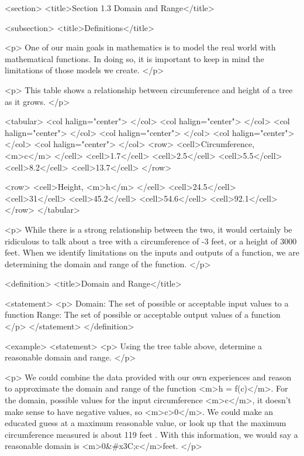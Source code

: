 <section>
    <title>Section 1.3 Domain and Range</title>

    <subsection>
        <title>Definitions</title>

        <p>
            One of our main goals in mathematics is to model the real world with mathematical functions.
            In doing so, it is important to keep in mind the limitations of those models we create.
        </p>

        <p>
            This table shows a relationship between circumference and height of a tree as it grows.
        </p>

        <tabular>
            <col halign="center"> </col> <col halign="center"> </col> <col halign="center"> </col> <col halign="center"> </col> <col halign="center"> </col> <col halign="center"> </col>
            <row>
                <cell>Circumference, <m>c</m> </cell>
                <cell>1.7</cell>
                <cell>2.5</cell>
                <cell>5.5</cell>
                <cell>8.2</cell>
                <cell>13.7</cell>
            </row>

            <row>
                <cell>Height, <m>h</m> </cell>
                <cell>24.5</cell>
                <cell>31</cell>
                <cell>45.2</cell>
                <cell>54.6</cell>
                <cell>92.1</cell>
            </row>
        </tabular>

        <p>
            While there is a strong relationship between the two, it would certainly be ridiculous to talk about a tree with a circumference of -3 feet, or a height of 3000 feet.
            When we identify limitations on the inputs and outputs of a function, we are determining the domain and range of the function.
        </p>

        <definition>
            <title>Domain and Range</title>

            <statement>
                <p>
                    Domain: The set of possible or acceptable input values to a function Range: The set of possible or acceptable output values of a function
                </p>
            </statement>
        </definition>

        <example>
            <statement>
                <p>
                    Using the tree table above, determine a reasonable domain and range.
                </p>

                <p>
                    We could combine the data provided with our own experiences and reason to approximate the domain and range of the function <m>h = f(c)</m>.
                    For the domain, possible values for the input circumference <m>c</m>, it doesn’t make sense to have negative values, so <m>c>0</m>.
                    We could make an educated guess at a maximum reasonable value, or look up that the maximum circumference measured is about 119 feet .
                    With this information, we would say a reasonable domain is <m>0&#x3C;c</m>feet.
                </p>

